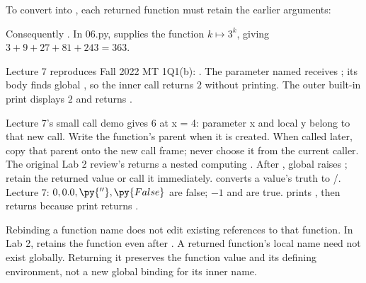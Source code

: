 \documentclass[10pt]{scrartcl}
\begin{document}
To convert  into , each returned function must retain the earlier arguments:
\begin{fig}
\end{fig}
Consequently . In 06.py,  supplies the function $k\mapsto3^k$, giving $3+9+27+81+243=363$.

Lecture 7 reproduces Fall 2022 MT 1Q1(b): . The parameter named  receives ; its body finds global , so the inner call returns $2$ without printing. The outer built-in print displays $2$ and returns .

\begin{shortcuts}
\ii Lecture 7's small call demo  gives 6 at x = 4: parameter x and local y belong to that new call.
\ii Write the function's parent when it is created. When called later, copy that parent onto the new call frame; never choose it from the current caller.
\ii The original Lab 2 review's  returns a nested  computing . After , global  raises ; retain the returned value or call it immediately.
\ii {} converts a value's truth to /. Lecture 7: $0,0.0,\py{''},\py{False}$ are false; $-1$ and  are true.  prints , then returns  because print returns .
\end{shortcuts}
\begin{trapbox}
\ii Rebinding a function name does not edit existing references to that function. In Lab 2,  retains the function even after .
\ii A returned function's local name need not exist globally. Returning it preserves the function value and its defining environment, not a new global binding for its inner name.
\end{trapbox}
\end{document}
